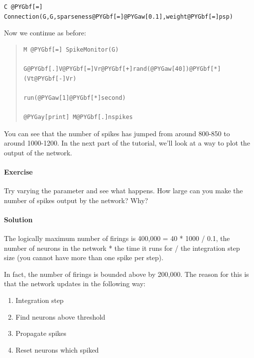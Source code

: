 \documentclass[letterpaper,10pt,english]{manual}
\begin{document}
\begin{Verbatim}[commandchars=@\[\]]
C @PYGbf[=] Connection(G,G,sparseness@PYGbf[=]@PYGaw[0.1],weight@PYGbf[=]psp)
\end{Verbatim}

Now we continue as before:
\begin{quote}

\begin{Verbatim}[commandchars=@\[\]]
M @PYGbf[=] SpikeMonitor(G)

G@PYGbf[.]V@PYGbf[=]Vr@PYGbf[+]rand(@PYGaw[40])@PYGbf[*](Vt@PYGbf[-]Vr)

run(@PYGaw[1]@PYGbf[*]second)

@PYGay[print] M@PYGbf[.]nspikes
\end{Verbatim}
\end{quote}

You can see that the number of spikes has jumped from around
800-850 to around 1000-1200. In the next part of the tutorial,
we'll look at a way to plot the output of the network.


\paragraph{Exercise}

Try varying the parameter  and see what happens. How large
can you make the number of spikes output by the network? Why?


\paragraph{Solution}

The logically maximum number of firings is
400,000 = 40 * 1000 / 0.1, the number of neurons in the
network * the time it runs for / the integration step size (you
cannot have more than one spike per step).

In fact, the number of firings is bounded above by 200,000. The
reason for this is that the network updates in the following way:
\begin{enumerate}
\item {} 
Integration step

\item {} 
Find neurons above threshold

\item {} 
Propagate spikes

\item {} 
Reset neurons which spiked

\end{enumerate}
\end{document}
